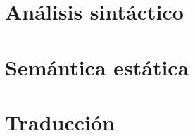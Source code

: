 \documentclass[11pt]{article}
\begin{document}
  \section{Análisis sintáctico}
  {
    \let\section\subsection
    \let\subsection\subsubsection
    
  }

  \section{Semántica estática}
  {
    \let\section\subsection
    \let\subsection\subsubsection
  }

  \section{Traducción}
  {
    \let\section\subsection
    \let\subsection\subsubsection
  }
\end{document}
